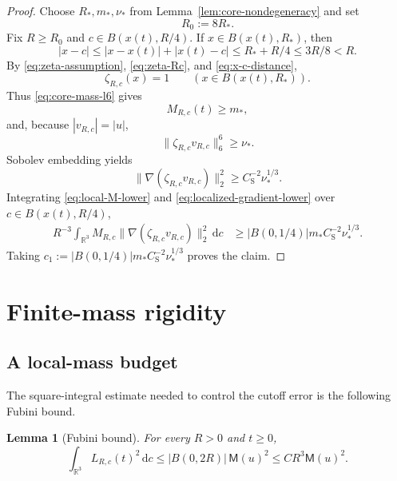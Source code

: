 \documentclass{interact}
\numberwithin{equation}{section}
\theoremstyle{plain}
\newtheorem{lemma}[theorem]{Lemma}
\theoremstyle{definition}
\theoremstyle{remark}
\newcommand{\R}{\mathbb R}
\newcommand{\M}{\mathsf M}
\newcommand{\cS}{C_{\mathrm S}}
\newcommand{\dd}{\,\mathrm d}
\begin{document}
\begin{proof}
Choose $R_*,m_*,\nu_*$ from Lemma~\ref{lem:core-nondegeneracy} and set
\begin{equation}\label{eq:R0-choice-basic}
 R_0:=8R_*.
\end{equation}
Fix $R\ge R_0$ and $c\in B(x(t),R/4)$. If $x\in B(x(t),R_*)$, then
\begin{equation}\label{eq:x-c-distance}
 |x-c|\le |x-x(t)|+|x(t)-c|
 \le R_*+R/4
 \le3R/8<R.
\end{equation}
By \eqref{eq:zeta-assumption}, \eqref{eq:zeta-Rc}, and \eqref{eq:x-c-distance},
\[
 \zeta_{R,c}(x)=1
 \qquad(x\in B(x(t),R_*)).
\]
Thus \eqref{eq:core-mass-l6} gives
\begin{equation}\label{eq:local-M-lower}
 M_{R,c}(t)\ge m_*,
\end{equation}
and, because $|v_{R,c}|=|u|$,
\[
 \|\zeta_{R,c}v_{R,c}\|_6^6\ge\nu_*.
\]
Sobolev embedding yields
\begin{equation}\label{eq:localized-gradient-lower}
 \|\nabla(\zeta_{R,c}v_{R,c})\|_2^2
 \ge \cS^{-2}\nu_*^{1/3}.
\end{equation}
Integrating \eqref{eq:local-M-lower} and \eqref{eq:localized-gradient-lower} over $c\in B(x(t),R/4)$,
\begin{align*}
 R^{-3}\int_{\R^3}M_{R,c}
 \|\nabla(\zeta_{R,c}v_{R,c})\|_2^2\dd c
 &\ge |B(0,1/4)|m_*\cS^{-2}\nu_*^{1/3}.
\end{align*}
Taking $c_1:=|B(0,1/4)|m_*\cS^{-2}\nu_*^{1/3}$ proves the claim.
\end{proof}

\section{Finite-mass rigidity}

\subsection{A local-mass budget}

The square-integral estimate needed to control the cutoff error is the following Fubini bound.

\begin{lemma}[Fubini bound]\label{lem:Fubini}
For every $R>0$ and $t\ge0$,
\begin{equation}\label{eq:Fubini-bound}
 \int_{\R^3}L_{R,c}(t)^2\dd c
 \le |B(0,2R)|\,\M(u)^2
 \le CR^3\M(u)^2.
\end{equation}
\end{lemma}
\end{document}
